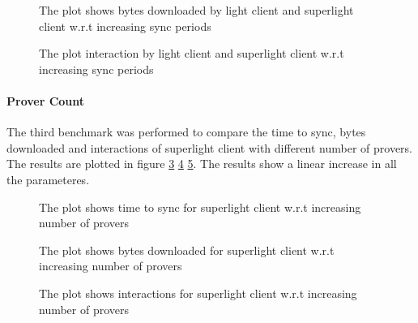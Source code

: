 \documentclass[a4paper,11pt,oneside]{article}
\theoremstyle{definition}
\begin{document}
  \begin{figure}[H]
    \begin{center}
         \scalebox{.8}{}
    \end{center}
    \caption{The plot shows bytes downloaded by light client and superlight client w.r.t increasing sync periods}
    \label{fig:bytes-downloaded-vs-periods}
  \end{figure}
  
  \begin{figure}[H]
    \begin{center}
         \scalebox{.8}{}
    \end{center}
    \caption{The plot interaction by light client and superlight client w.r.t increasing sync periods}
    \label{fig:interactions-vs-periods}
  \end{figure}
  
  \paragraph{Prover Count}
  The third benchmark was performed to compare the time to sync, bytes downloaded and interactions of superlight client with different number of provers. The results are plotted in figure \ref{fig:time-to-sync-vs-provers} \ref{fig:bytes-downloaded-vs-provers} \ref{fig:interactions-vs-provers}. The results show a linear increase in all the parameteres. 

  \begin{figure}[H]
    \begin{center}
         \scalebox{.8}{}
    \end{center}
    \caption{The plot shows time to sync for superlight client w.r.t increasing number of provers}
    \label{fig:time-to-sync-vs-provers}
  \end{figure}
  
  \begin{figure}[H]
    \begin{center}
        \scalebox{.8}{}
    \end{center}
    \caption{The plot shows bytes downloaded for superlight client w.r.t increasing number of provers}
    \label{fig:bytes-downloaded-vs-provers}
  \end{figure}
  
  \begin{figure}[H]
    \begin{center}
         \scalebox{.8}{}
    \end{center}
    \caption{The plot shows interactions for superlight client w.r.t increasing number of provers}
    \label{fig:interactions-vs-provers}
  \end{figure}
\end{document}
